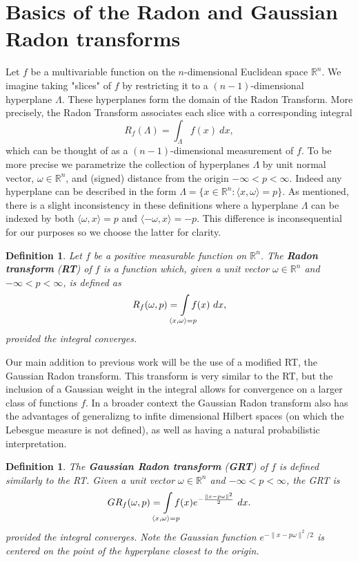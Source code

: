 \documentclass{amsart}
\newtheorem{definition}[theorem]{Definition}
\theoremstyle{remark}
\numberwithin{equation}{section}
\newcommand{\RR}{\mathbb{R}}
\def\mclimits_#1{\limits_{\mathclap{#1}}}
\begin{document}
\newpage
\section{Basics of the Radon and Gaussian Radon transforms}

Let $f$ be a multivariable function on the $n$-dimensional Euclidean space $\RR^n$. We imagine taking "slices" of $f$ by restricting it to a $(n-1)$-dimensional hyperplane $\Lambda$. These hyperplanes form the domain of the Radon Transform. More precisely, the Radon Transform associates each slice with a corresponding integral
\[
    R_f(\Lambda) = \int_{\Lambda} f(x) ~dx,
\]
which can be thought of as a $(n-1)$-dimensional measurement of $f$. To be more precise we parametrize the collection of hyperplanes $\Lambda$ by unit normal vector, $\omega \in \RR^n$, and (signed) distance from the origin $-\infty < p < \infty$. Indeed any hyperplane can be described in the form $\Lambda = \{x \in \RR^n: \langle x, \omega\rangle = p\}$. As mentioned, there is a slight inconsistency in these definitions where a hyperplane $\Lambda$ can be indexed by both $\langle \omega, x \rangle = p$ and $\langle -\omega, x \rangle = -p$. This difference is inconsequential for our purposes so we choose the latter for clarity.

\begin{definition}
    Let $f$ be a positive measurable function on $\mathbb{R}^n$. The \textbf{Radon transform} (\textbf{RT}) of $f$ is a function which, given a unit vector $\omega \in \RR^n$ and $-\infty < p < \infty$, is defined as
    \[
        R_f(\omega, p) = \int\mclimits_{\langle x, \omega \rangle = p} f(x) ~dx,
    \]
    provided the integral converges.
\end{definition}

Our main addition to previous work will be the use of a modified RT, the Gaussian Radon transform. This transform is very similar to the RT, but the inclusion of a Gaussian weight in the integral allows for convergence on a larger class of functions $f$. In a broader context the Gaussian Radon transform also has the advantages of generalizng to infite dimensional Hilbert spaces (on which the Lebesgue measure is not defined), as well as having a natural probabilistic interpretation.

\begin{definition}
The \textbf{Gaussian Radon transform} (\textbf{GRT}) of $f$ is defined similarly to the RT. Given a unit vector $\omega \in \RR^n$ and $-\infty < p < \infty$, the GRT is
\[
    GR_f(\omega, p) = 
    \int\mclimits_{\langle x, \omega \rangle = p} f(x) e^{-\frac{\|x - p\omega\|^2} 2} ~dx.
\]
provided the integral converges. Note the Gaussian function $e^{-\|x - p\omega\|^2/2}$ is centered on the point of the hyperplane closest to the origin.
\end{definition}
\end{document}
